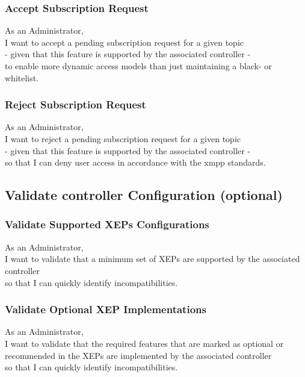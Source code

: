 \subsubsection{Accept Subscription Request}

As an Administrator,\\
I want to accept a pending subscription request for a given topic\\
- given that this feature is supported by the associated controller -\\
to enable more dynamic access models than just maintaining a black- or whitelist.

\subsubsection{Reject Subscription Request}

As an Administrator,\\
I want to reject a pending subscription request for a given topic\\
- given that this feature is supported by the associated controller -\\
so that I can deny user access in accordance with the \gls{xmpp} standards.

\subsection{Validate controller Configuration (optional)}\label{sec:validate-controller-config}

\subsubsection{Validate Supported XEPs Configurations}
As an Administrator,\\
I want to validate that a minimum set of XEPs are supported by the associated controller\\
so that I can quickly identify incompatibilities.

\subsubsection{Validate Optional XEP Implementations}
As an Administrator,\\
I want to validate that the required features that are marked as optional or recommended in the XEPs are implemented by the associated controller\\
so that I can quickly identify incompatibilities.

